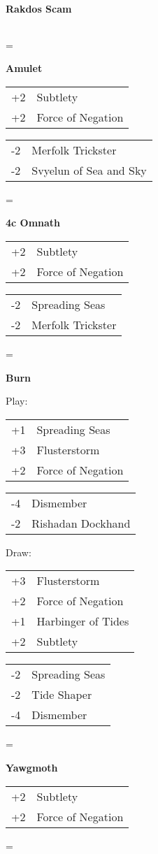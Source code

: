 \documentclass[fontsize=12pt,paper=a4]{scrartcl}
\newenvironment{absolutelynopagebreak}
  {\par\nobreak\vfil\penalty0\vfilneg
   \vtop\bgroup}
  {\par\xdef\tpd{\the\prevdepth}\egroup
   \prevdepth=\tpd}
\newenvironment{decklist}{%
    \begin{tabular}{>{\hspace{-4pt}}r<{\hspace{-3pt}}>{\hspace{-3pt}}l<{\hspace{-4pt}}}
    }{%
    \end{tabular}
    \par
}
\newcommand{\card}[2]{#1 & #2\\}
\newenvironment{sideboardguide}{%
    \newpage
    \begin{multicols}{4}
        \begin{small}
        }{%
        \end{small}
    \end{multicols}
}
\newenvironment{matchup}[1]{%
    \begin{absolutelynopagebreak}
        \textbf{#1}\par
    }{%
    \end{absolutelynopagebreak}
    \par\vspace{2em}
}
\begin{document}
\begin{sideboardguide}
\begin{matchup}{Rakdos Scam}
\begin{decklist}
        \end{decklist}
    \end{matchup}
    \begin{matchup}{Amulet}
        \begin{decklist}
            \card{+2}{Subtlety}
            \card{+2}{Force of Negation}
        \end{decklist}
        \begin{decklist}
            \card{-2}{Merfolk Trickster}
            \card{-2}{Svyelun of Sea and Sky}
        \end{decklist}
    \end{matchup}
    \begin{matchup}{4c Omnath}
        \begin{decklist}
            \card{+2}{Subtlety}
            \card{+2}{Force of Negation}
        \end{decklist}
        \begin{decklist}
            \card{-2}{Spreading Seas}
            \card{-2}{Merfolk Trickster}
        \end{decklist}
    \end{matchup}
    \begin{matchup}{Burn}
        Play:\par
        \begin{decklist}
            \card{+1}{Spreading Seas}
            \card{+3}{Flusterstorm}
            \card{+2}{Force of Negation}
        \end{decklist}
        \begin{decklist}
            \card{-4}{Dismember}
            \card{-2}{Rishadan Dockhand}
        \end{decklist}
        Draw:\par
        \begin{decklist}
            \card{+3}{Flusterstorm}
            \card{+2}{Force of Negation}
            \card{+1}{Harbinger of Tides}
            \card{+2}{Subtlety}
        \end{decklist}
        \begin{decklist}
            \card{-2}{Spreading Seas}
            \card{-2}{Tide Shaper}
            \card{-4}{Dismember}
        \end{decklist}
    \end{matchup}
    \begin{matchup}{Yawgmoth}
        \begin{decklist}
            \card{+2}{Subtlety}
            \card{+2}{Force of Negation}

\end{decklist}
\end{matchup}
\end{sideboardguide}
\end{document}
